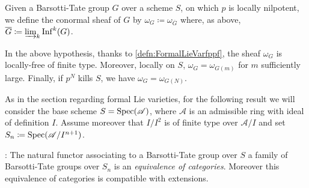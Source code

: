 \begin{defn}
	Given a Barsotti-Tate group $G$ over a scheme $S$, on which $p$ is locally nilpotent,
	we define the conormal sheaf of $G$ by $\omega_G \coloneqq \omega_{\overline{G}}$
	where, as above, $\overline{G} \coloneqq \varinjlim_k \operatorname{Inf}^k(G)$.
\end{defn}


\begin{rem}\label{rem:ConormalSheafBT}
	In the above hypothesis,
	thanks to \cref{defn:FormalLieVarfppf}, 
	the sheaf $\omega_G$ is
	locally-free of finite type.
	Moreover, locally on $S$, $\omega_G = \omega_{G(m)}$ for
	$m$ sufficiently large.
	Finally, if $p^N$ kills $S$, we have $\omega_G = \omega_{G(N)}$.
\end{rem}


\noindent
As in the section regarding formal Lie varieties,
for the following result we will consider the base scheme \(S = \operatorname{Spec}(\mathscr{A})\),
where \(\mathscr{A}\) is an admissible ring with ideal of definition \(I\).
Assume moreover that \(I/I^2\) is of finite type over \(\mathscr{A}/I\) and
set \(S_n \coloneqq \operatorname{Spec}(\mathscr{A}/I^{ n+1 })\).
\begin{lem}\label{lem:BT/admissible}
:	The natural functor associating to a Barsotti-Tate group over \(S\)
	a family of Barsotti-Tate groups over \(S_n\) is an
	\emph{equivalence of categories}.
	Moreover this equivalence of categories is compatible
	with extensions.
\end{lem}


